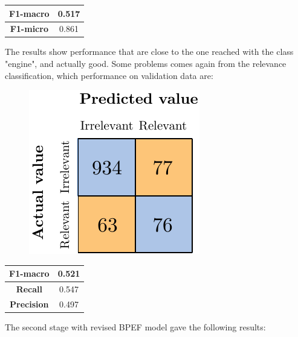 \begin{center}
	\begin{tabular}{ | c | c | } 
		\hline
		\textbf{F1-macro} & 0.517 \\
		\hline
		\textbf{F1-micro} & 0.861 \\ 
		\hline
	\end{tabular}
\end{center}

The results show performance that are close to the one reached with the class "engine", and actually good. Some problems comes again from the relevance classification, which performance on validation data are:

\begin{figure}[H]
	\centering
	\includegraphics[scale=1]{figures/conf_matrices/ita_exteriors/ita_rel_exteriors_logreg_afs.pdf}
	\label{fig:ita_rel_exteriors_logreg_afs}
\end{figure}

\begin{center}
	\begin{tabular}{ | c | c | } 
		\hline
		\textbf{F1-macro} & 0.521 \\
		\hline
		\textbf{Recall} & 0.547 \\ 
		\hline
		\textbf{Precision} & 0.497 \\ 
		\hline
	\end{tabular}
\end{center}

The second stage with revised BPEF model gave the following results:

